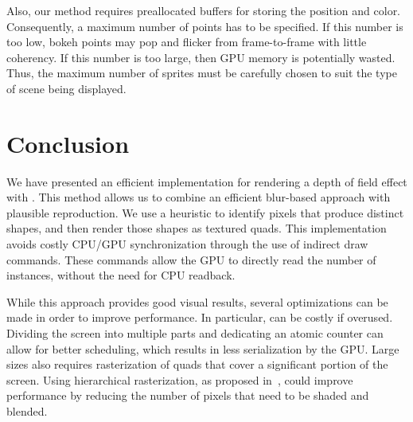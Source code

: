 Also, our method requires preallocated buffers for storing the \bokeh position and color. Consequently, a maximum number of \bokeh points has to be specified. If this number is too low, bokeh points may pop and flicker from frame-to-frame with little coherency. If this number is too large, then GPU memory is potentially wasted. Thus, the maximum number of sprites must be carefully chosen to suit the type of scene being displayed.

\section{Conclusion}
We have presented an efficient implementation for rendering a depth of field effect with \bokeh. This method allows us to combine an efficient blur-based approach with plausible \bokeh reproduction. We use a heuristic to identify pixels that produce distinct \bokeh shapes, and then render those shapes as textured quads. This implementation avoids costly CPU/GPU synchronization through the use of indirect draw commands. These commands allow the GPU to directly read the number of instances, without the need for CPU readback.


While this approach provides good visual results, several optimizations can be made in order to improve performance. In particular,  can be costly if overused. Dividing the screen into multiple parts and dedicating an atomic counter can allow for better scheduling, which results in less serialization by the GPU. Large \coc sizes also requires rasterization of quads that cover a significant portion of the screen. Using hierarchical rasterization, as proposed in~\cite{Futurmark11}, could improve performance by reducing the number of pixels that need to be shaded and blended.




